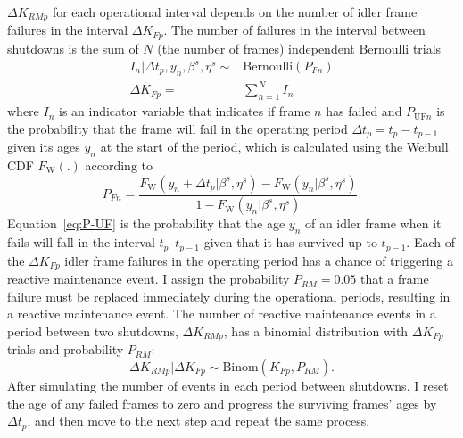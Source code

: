 $\Delta K_{RM p}$ for each operational interval depends on the number of idler frame failures in the interval $\Delta K_{F p}$. The number of failures in the interval between shutdowns is the sum of $N$ (the number of frames) independent Bernoulli trials
\begin{align*}
 I_n|\Delta t_p, y_n, \beta^s, \eta^s \sim & \mbox{Bernoulli}(P_{F n}) \\
 \Delta K_{F p} = & \sum^N_{n = 1} I_n
\end{align*}
where $I_n$ is an indicator variable that indicates if frame $n$ has failed and $P_{\text{UF} n}$ is the probability that the frame will fail in the operating period $\Delta t_p = t_p - t_{p-1}$ given its ages $y_n$ at the start of the period, which is calculated using the Weibull CDF $F_{\text{W}}(.)$ according to
\begin{equation}
  \label{eq:P-UF}
 P_{F n} = \frac{F_{\text{W}}(y_n + \Delta t_p|\beta^s, \eta^s) - F_{\text{W}}(y_n|\beta^s, \eta^s)}{1 - F_{\text{W}}(y_n|\beta^s, \eta^s)}.
\end{equation}
Equation~\eqref{eq:P-UF} is the probability that the age $y_n$ of an idler frame when it fails will fall in the interval $t_p$--$t_{p-1}$ given that it has survived up to $t_{p-1}$. Each of the $\Delta K_{F p}$ idler frame failures in the operating period has a chance of triggering a reactive maintenance event. I assign the probability $P_{RM} = 0.05$ that a frame failure must be replaced immediately during the operational periods, resulting in a reactive maintenance event. The number of reactive maintenance events in a period between two shutdowns, $\Delta K_{RM p}$, has a binomial distribution with $\Delta K_{F p}$ trials and probability $P_{RM}$:
\begin{equation*}
 \Delta K_{RM p}|\Delta K_{F p} \sim \mbox{Binom}(K_{F p}, P_{RM}).
\end{equation*}
After simulating the number of events in each period between shutdowns, I reset the age of any failed frames to zero and progress the surviving frames' ages by $\Delta t_p$, and then move to the next step and repeat the same process.

